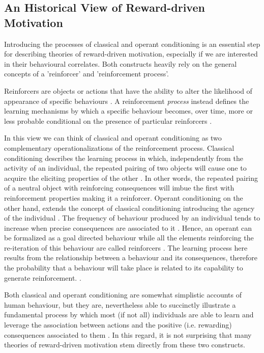 \subsection{An Historical View of Reward-driven Motivation}
\label{motivation_hist}
Introducing the processes of classical and operant conditioning is an essential step for describing theories of reward-driven motivation, especially if we are interested in their behavioural correlates. Both constructs heavily rely on the general concepts of a 'reinforcer' and 'reinforcement process'. 

Reinforcers are objects or actions that have the ability to alter the likelihood of appearance of specific behaviours \cite{kling1971woodworth,skinner1953science,squire2012fundamental}. A reinforcement \textit{process} instead defines the learning mechanisms by which a specific behaviour becomes, over time, more or less probable conditional on the presence of particular reinforcers \cite{kling1971woodworth}. 

In this view we can think of classical and operant conditioning as two complementary operationalizations of the reinforcement process. 
Classical conditioning describes the learning process in which, independently from the activity of an individual, the repeated pairing of two objects will cause one to acquire the eliciting properties of the other \cite{squire2012fundamental}. In other words, the repeated pairing of a neutral object with reinforcing consequences will imbue the first with reinforcement properties making it a reinforcer. 
Operant conditioning on the other hand, extends the concept of classical conditioning introducing the agency of the individual \cite{skinner1953science}. The frequency of behaviour produced by an individual tends to increase when precise consequences are associated to it \cite{skinner1953science}. Hence, an operant can be formalized as a goal directed behaviour while all the elements reinforcing the re-iteration of this behaviour are called reinforcers \cite{skinner1953science}. The learning process here results from the relationship between a behaviour and its consequences, therefore the probability that a behaviour will take place is related to its capability to generate reinforcement. \cite{kling1971woodworth}. 

Both classical and operant conditioning are somewhat simplistic accounts of human behaviour, but they are, nevertheless able to succinctly illustrate a fundamental process by which most (if not all) individuals are able to learn and leverage the association between actions and the positive (i.e. rewarding) consequences associated to them \cite{schultz1997neural,simpson2016behavioral}. In this regard, it is not surprising that many theories of reward-driven motivation stem directly from these two constructs. 

